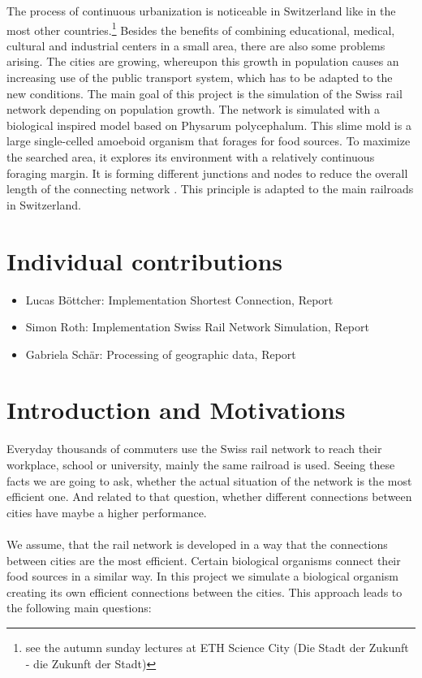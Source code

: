 \documentclass[11pt]{scrartcl}
\begin{document}
The process of continuous urbanization is noticeable in Switzerland like in the most other countries.\footnote[1]{see the autumn sunday lectures at ETH Science City (Die Stadt der Zukunft - die Zukunft der Stadt)} Besides the benefits of combining educational, medical, cultural and industrial centers in a small area, there are also some problems arising. The cities are growing, whereupon this growth in population causes an increasing use of the public transport system, which has to be adapted to the new conditions. The main goal of this project is the simulation of the Swiss rail network depending on population growth. The network is simulated with a biological inspired model based on Physarum polycephalum. This slime mold is a large single-celled amoeboid organism that forages for food sources. To maximize the searched area, it explores its environment with a relatively continuous foraging margin. It is forming different junctions and nodes to reduce the overall length of the connecting network \cite{network_tokyo}. This principle is adapted to the main railroads in Switzerland. 


\section{Individual contributions}
\begin{itemize}
  \item Lucas Böttcher: Implementation Shortest Connection, Report
  \item Simon Roth: Implementation Swiss Rail Network Simulation, Report
  \item Gabriela Schär: Processing of geographic data, Report
\end{itemize}


\section{Introduction and Motivations}
\label{sec:introduction}
Everyday thousands of commuters use the Swiss rail network to reach their workplace, school or university, mainly the same railroad is used. Seeing these facts we are going to ask, whether the actual situation of the network is the most efficient one. And related to that question, whether different connections between cities have maybe a higher performance.\\
\\
We assume, that the rail network is developed in a way that the connections between cities are the most efficient. Certain biological organisms connect their food sources in a similar way. In this project we simulate a biological organism creating its own efficient connections between the cities. This approach leads to the following main questions:
\end{document}
